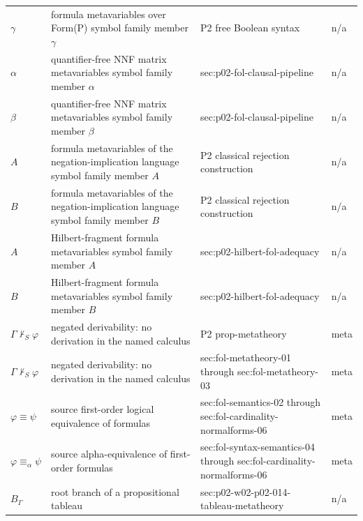 \begin{longtable}{@{}p{}p{}p{}p{}@{}}
\(\gamma\) & formula metavariables over Form(P) symbol family member \(\gamma\) & P2 free Boolean syntax & n/a \\
\(\alpha\) & quantifier-free NNF matrix metavariables symbol family member \(\alpha\) & sec:\allowbreak{}p02-\allowbreak{}fol-\allowbreak{}clausal-\allowbreak{}pipeline & n/a \\
\(\beta\) & quantifier-free NNF matrix metavariables symbol family member \(\beta\) & sec:\allowbreak{}p02-\allowbreak{}fol-\allowbreak{}clausal-\allowbreak{}pipeline & n/a \\
\(A\) & formula metavariables of the negation-implication language symbol family member \(A\) & P2 classical rejection construction & n/a \\
\(B\) & formula metavariables of the negation-implication language symbol family member \(B\) & P2 classical rejection construction & n/a \\
\(A\) & Hilbert-fragment formula metavariables symbol family member \(A\) & sec:\allowbreak{}p02-\allowbreak{}hilbert-\allowbreak{}fol-\allowbreak{}adequacy & n/a \\
\(B\) & Hilbert-fragment formula metavariables symbol family member \(B\) & sec:\allowbreak{}p02-\allowbreak{}hilbert-\allowbreak{}fol-\allowbreak{}adequacy & n/a \\
\(\Gamma\nvdash_{S}\varphi\) & negated derivability: no derivation in the named calculus & P2 prop-\allowbreak{}metatheory & meta \\
\(\Gamma\nvdash_{S}\varphi\) & negated derivability: no derivation in the named calculus & sec:\allowbreak{}fol-\allowbreak{}metatheory-\allowbreak{}01 through sec:\allowbreak{}fol-\allowbreak{}metatheory-\allowbreak{}03 & meta \\
\(\varphi\equiv\psi\) & source first-order logical equivalence of formulas & sec:\allowbreak{}fol-\allowbreak{}semantics-\allowbreak{}02 through sec:\allowbreak{}fol-\allowbreak{}cardinality-\allowbreak{}normalforms-\allowbreak{}06 & meta \\
\(\varphi\equiv_\alpha\psi\) & source alpha-equivalence of first-order formulas & sec:\allowbreak{}fol-\allowbreak{}syntax-\allowbreak{}semantics-\allowbreak{}04 through sec:\allowbreak{}fol-\allowbreak{}cardinality-\allowbreak{}normalforms-\allowbreak{}06 & meta \\
\(B_\Gamma\) & root branch of a propositional tableau & sec:\allowbreak{}p02-\allowbreak{}w02-\allowbreak{}p02-\allowbreak{}014-\allowbreak{}tableau-\allowbreak{}metatheory & n/a \\

\end{longtable}
